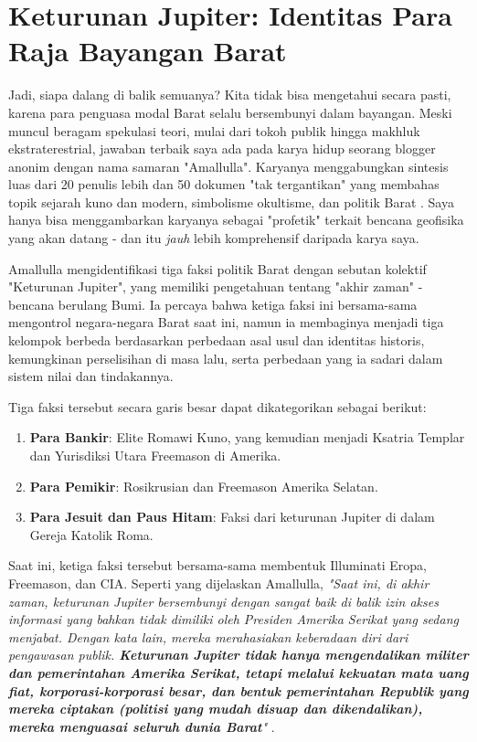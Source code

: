 \documentclass[10pt,twocolumn,letterpaper]{article}
\begin{document}
\section{Keturunan Jupiter: Identitas Para Raja Bayangan Barat}

Jadi, siapa dalang di balik semuanya? Kita tidak bisa mengetahui secara pasti, karena para penguasa modal Barat selalu bersembunyi dalam bayangan. Meski muncul beragam spekulasi teori, mulai dari tokoh publik hingga makhluk ekstraterestrial, jawaban terbaik saya ada pada karya hidup seorang blogger anonim dengan nama samaran "Amallulla". Karyanya menggabungkan sintesis luas dari 20 penulis lebih dan 50 dokumen "tak tergantikan" yang membahas topik sejarah kuno dan modern, simbolisme okultisme, dan politik Barat \cite{33,34}. Saya hanya bisa menggambarkan karyanya sebagai "profetik" terkait bencana geofisika yang akan datang - dan itu \textit{jauh} lebih komprehensif daripada karya saya.

Amallulla mengidentifikasi tiga faksi politik Barat dengan sebutan kolektif "Keturunan Jupiter", yang memiliki pengetahuan tentang "akhir zaman" - bencana berulang Bumi. Ia percaya bahwa ketiga faksi ini bersama-sama mengontrol negara-negara Barat saat ini, namun ia membaginya menjadi tiga kelompok berbeda berdasarkan perbedaan asal usul dan identitas historis, kemungkinan perselisihan di masa lalu, serta perbedaan yang ia sadari dalam sistem nilai dan tindakannya.

Tiga faksi tersebut secara garis besar dapat dikategorikan sebagai berikut:

\begin{flushleft}
\begin{enumerate}
    \item \textbf{Para Bankir}: Elite Romawi Kuno, yang kemudian menjadi Ksatria Templar dan Yurisdiksi Utara Freemason di Amerika.
    \item \textbf{Para Pemikir}: Rosikrusian dan Freemason Amerika Selatan.
    \item \textbf{Para Jesuit dan Paus Hitam}: Faksi dari keturunan Jupiter di dalam Gereja Katolik Roma.
\end{enumerate}
\end{flushleft}

Saat ini, ketiga faksi tersebut bersama-sama membentuk Illuminati Eropa, Freemason, dan CIA. Seperti yang dijelaskan Amallulla, \textit{"Saat ini, di akhir zaman, keturunan Jupiter bersembunyi dengan sangat baik di balik izin akses informasi yang bahkan tidak dimiliki oleh Presiden Amerika Serikat yang sedang menjabat. Dengan kata lain, mereka merahasiakan keberadaan diri dari pengawasan publik. \textbf{Keturunan Jupiter tidak hanya mengendalikan militer dan pemerintahan Amerika Serikat, tetapi melalui kekuatan mata uang fiat, korporasi-korporasi besar, dan bentuk pemerintahan Republik yang mereka ciptakan (politisi yang mudah disuap dan dikendalikan), mereka menguasai seluruh dunia Barat}"} \cite{33,34}.
\end{document}
